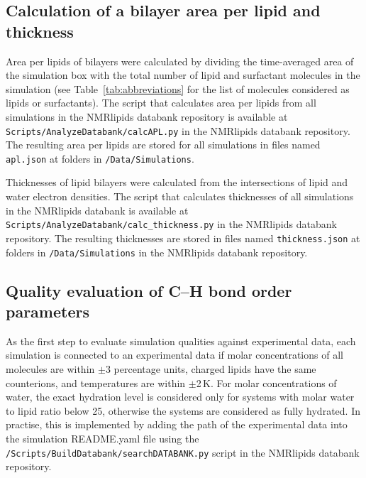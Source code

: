 \documentclass[fleqn,10pt]{wlscirep}
\begin{document}
\subsection{Calculation of a bilayer area per lipid and thickness}
Area per lipids of bilayers were calculated by dividing the time-averaged area of the simulation box with the total number of lipid and surfactant molecules in the simulation (see Table~\ref{tab:abbreviations} for the list of molecules considered as lipids or surfactants). The script that calculates area per lipids from all simulations in the NMRlipids databank repository is available at \texttt{Scripts/AnalyzeDatabank/calcAPL.py} in the NMRlipids databank repository. The resulting area per lipids are stored for all simulations in files named \texttt{apl.json} at folders in \texttt{/Data/Simulations}. 

Thicknesses of lipid bilayers were calculated from the intersections of lipid and water electron densities. The script that calculates thicknesses of all simulations in the NMRlipids databank is available at \texttt{Scripts/AnalyzeDatabank/calc\_thickness.py} in the NMRlipids databank repository. The resulting thicknesses are stored in files named \texttt{thickness.json} at folders in \texttt{/Data/Simulations} in the NMRlipids databank repository. 

\subsection{Quality evaluation of C--H bond order parameters}
As the first step to evaluate simulation qualities against experimental data, each simulation is connected to an experimental data if molar concentrations of all molecules are within $\pm$3 percentage units, charged lipids have the same counterions, and temperatures are within $\pm$2\,K. For molar concentrations of water, the exact hydration level is considered only for systems with molar water to lipid ratio below 25, otherwise the systems are considered as fully hydrated. In practise, this is implemented by adding the path of the experimental data into the simulation README.yaml file using the \texttt{/Scripts/BuildDatabank/searchDATABANK.py} script in the NMRlipids databank repository. 
\end{document}
